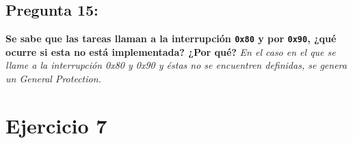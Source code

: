 \documentclass[10pt, a4paper]{article}
\begin{document}
{\subsection{Pregunta 15:}} \textbf{Se sabe que las tareas llaman a la interrupción \texttt{0x80} y por \texttt{0x90}, ¿qué ocurre si esta no está implementada? ¿Por qué?}\newline
\newline
\textit{En el caso en el que se llame a la interrupción 0x80 y 0x90 y éstas no se encuentren definidas, se genera un General Protection.}

\section{Ejercicio 7}
\end{document}
